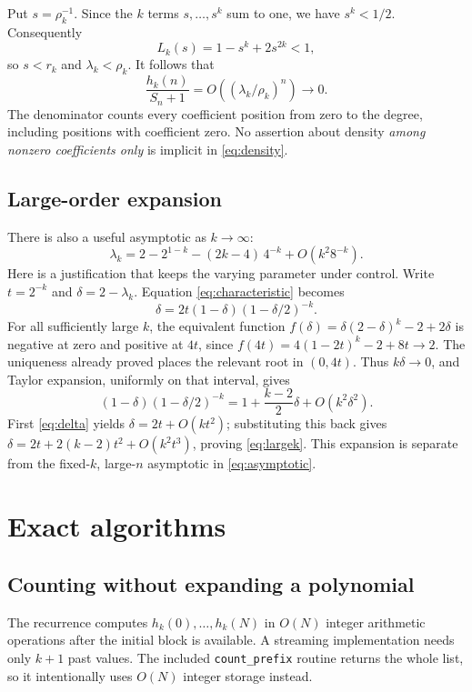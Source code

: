 \documentclass[11pt]{article}
\numberwithin{equation}{section}
\theoremstyle{definition}
\theoremstyle{remark}
\begin{document}
Put $s=\rho_k^{-1}$. Since the $k$ terms $s,\ldots,s^k$ sum to one,
we have $s^k<1/2$. Consequently
\[
 L_k(s)=1-s^k+2s^{2k}<1,
\]
so $s<r_k$ and $\lambda_k<\rho_k$. It follows that
\begin{equation}\label{eq:density}
 \frac{h_k(n)}{S_n+1}=O\!\left((\lambda_k/\rho_k)^n\right)\longrightarrow0.
\end{equation}
The denominator counts every coefficient position from zero to the degree,
including positions with coefficient zero. No assertion about density
\emph{among nonzero coefficients only} is implicit in \eqref{eq:density}.

\subsection{Large-order expansion}
There is also a useful asymptotic as $k\to\infty$:
\begin{equation}\label{eq:largek}
 \lambda_k=2-2^{1-k}-(2k-4)\,4^{-k}+O(k^2 8^{-k}).
\end{equation}
Here is a justification that keeps the varying parameter under control.
Write $t=2^{-k}$ and $\delta=2-\lambda_k$. Equation
\eqref{eq:characteristic} becomes
\begin{equation}\label{eq:delta}
 \delta=2t(1-\delta)(1-\delta/2)^{-k}.
\end{equation}
For all sufficiently large $k$, the equivalent function
$f(\delta)=\delta(2-\delta)^k-2+2\delta$ is negative at zero and
positive at $4t$, since $f(4t)=4(1-2t)^k-2+8t\to2$.
The uniqueness already proved places the relevant root in $(0,4t)$.
Thus $k\delta\to0$, and Taylor expansion, uniformly on that interval,
gives
\[
 (1-\delta)(1-\delta/2)^{-k}
 =1+\frac{k-2}{2}\delta+O(k^2\delta^2).
\]
First \eqref{eq:delta} yields $\delta=2t+O(kt^2)$; substituting this
back gives $\delta=2t+2(k-2)t^2+O(k^2t^3)$, proving
\eqref{eq:largek}. This expansion is separate from the fixed-$k$,
large-$n$ asymptotic in \eqref{eq:asymptotic}.

\section{Exact algorithms}
\subsection{Counting without expanding a polynomial}
The recurrence computes $h_k(0),\ldots,h_k(N)$ in $O(N)$ integer
arithmetic operations after the initial block is available. A streaming
implementation needs only $k+1$ past values. The included
\texttt{count\_prefix} routine returns the whole list, so it intentionally
uses $O(N)$ integer storage instead.
\end{document}
